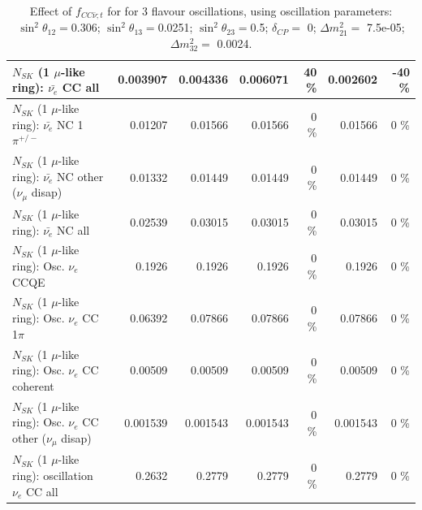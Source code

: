 \begin{table}
\begin{tabular}{| l | r | r | r  r | r  r |}
                            $N_{SK}$ (1 $\mu$-like ring): $\bar{\nu_{e}}$ CC all &        0.003907 &        0.004336 &        0.006071 &       40 \%  &        0.002602 &      -40 \%  \\ 
\hline
                     $N_{SK}$ (1 $\mu$-like ring): $\bar{\nu_e}$ NC 1$\pi^{+/-}$ &         0.01207 &         0.01566 &         0.01566 &        0 \%  &         0.01566 &        0 \%  \\ 
          $N_{SK}$ (1 $\mu$-like ring): $\bar{\nu_e}$ NC other ($\nu_\mu$ disap) &         0.01332 &         0.01449 &         0.01449 &        0 \%  &         0.01449 &        0 \%  \\ 
                            $N_{SK}$ (1 $\mu$-like ring): $\bar{\nu_{e}}$ NC all &         0.02539 &         0.03015 &         0.03015 &        0 \%  &         0.03015 &        0 \%  \\ 
\hline
\hline
\hline
                                 $N_{SK}$ (1 $\mu$-like ring): Osc. $\nu_e$ CCQE &          0.1926 &          0.1926 &          0.1926 &        0 \%  &          0.1926 &        0 \%  \\ 
                            $N_{SK}$ (1 $\mu$-like ring): Osc. $\nu_e$ CC 1$\pi$ &         0.06392 &         0.07866 &         0.07866 &        0 \%  &         0.07866 &        0 \%  \\ 
                          $N_{SK}$ (1 $\mu$-like ring): Osc. $\nu_e$ CC coherent &         0.00509 &         0.00509 &         0.00509 &        0 \%  &         0.00509 &        0 \%  \\ 
           $N_{SK}$ (1 $\mu$-like ring): Osc. $\nu_e$ CC other ($\nu_\mu$ disap) &        0.001539 &        0.001543 &        0.001543 &        0 \%  &        0.001543 &        0 \%  \\ 
                        $N_{SK}$ (1 $\mu$-like ring): oscillation $\nu_e$ CC all &          0.2632 &          0.2779 &          0.2779 &        0 \%  &          0.2779 &        0 \%  \\ 
\hline
\hline
\end{tabular}
\caption{ Effect of $f_{CC\bar{\nu}; t}$ for for 3 flavour oscillations, using oscillation parameters:  $\sin^2\theta_{12} = $0.306; $\sin^2\theta_{13} = $0.0251; $\sin^2\theta_{23} = $0.5; $\delta_{CP} = $        0; $\Delta m^2_{21} = $    7.5e-05; $\Delta m^2_{32} = $    0.0024. }
\label{tab:num_xsec_norm_antinutonu_1RmuT_3f_osc_t13:0.0251}
\end{table}
\clearpage
